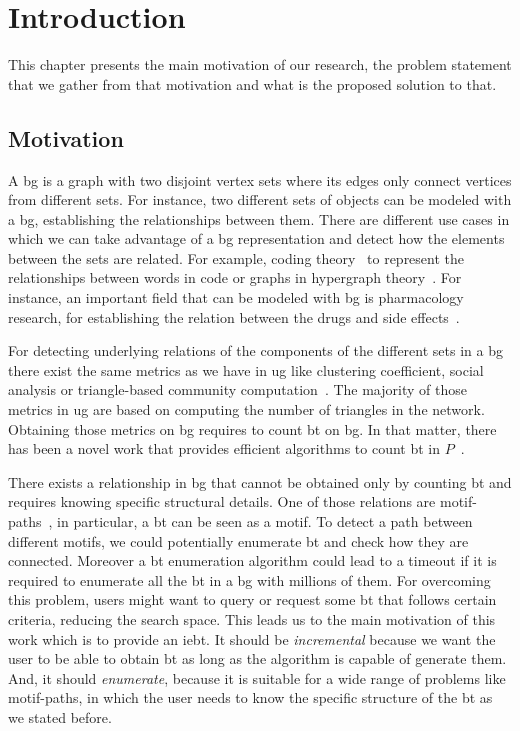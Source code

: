 \chapter{Introduction}\label{intro}
This chapter presents the main motivation of our research, the problem statement that we gather from that motivation
and what is the proposed solution to that.

\section{Motivation}
A \acrfull{bg} is a graph with two disjoint vertex sets where its edges only connect vertices from different sets. 
For instance, two different sets of objects can be modeled with a \acrshort{bg}, establishing the relationships between them.
There are different use cases in which we can take advantage of a \acrshort{bg} representation and detect how the elements between the sets
are related. For example, coding theory~\cite{DBLP:journals/corr/WangL13} to represent the relationships between words in code or graphs in hypergraph theory~\cite{hypergraph}. 
For instance, an important field that can be modeled with \acrshort{bg} is pharmacology research, for establishing the relation between the drugs and side effects~\cite{drugs}.

For detecting underlying relations of the components of the different sets in a \acrshort{bg} there exist the same metrics as we have in \acrfull{ug} like clustering coefficient, social analysis or triangle-based community computation~\cite{ccoef,detect_graph,Newman_2003}.
The majority of those metrics in \acrshort{ug} are based on computing the number of triangles in the network. Obtaining those metrics on \acrshort{bg} requires to count \acrfull{bt} on \acrshort{bg}.
In that matter, there has been a novel work that provides efficient algorithms to count \acrshort{bt} in $P$~\cite{btcount}.

There exists a relationship in \acrshort{bg} that cannot be obtained only by counting \acrshort{bt} and requires knowing specific
structural details. One of those relations are motif-paths~\cite{Li2019MotifPA}, in particular, a \acrshort{bt} can be seen as a motif. To detect a path between different motifs, we could potentially enumerate \acrshort{bt} and check how they are connected.
Moreover a \acrshort{bt} enumeration algorithm could lead to a timeout if it is required to enumerate all the \acrshort{bt} in a \acrshort{bg} with millions of them. For overcoming this problem, users might want to query or request some \acrshort{bt} that follows certain criteria, reducing the search space. 
This leads us to the main motivation of this work which is to provide an \acrfull{iebt}. It should be \emph{incremental} because we want the user to be able to obtain \acrshort{bt} as long as the algorithm is capable of generate them. 
And, it should \emph{enumerate}, because it is suitable for a wide range of problems like motif-paths, in which the user needs to know the specific structure of the \acrshort{bt} as we stated before.

